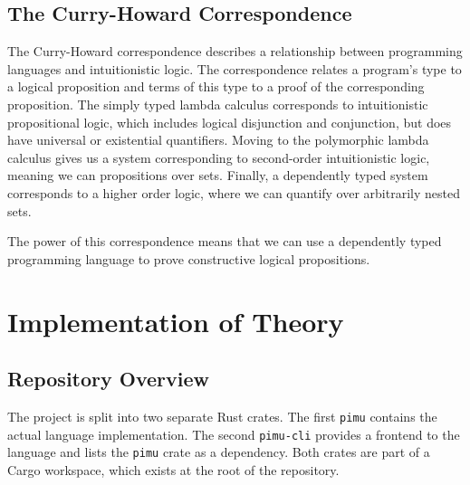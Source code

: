 \documentclass[12pt,a4paper,twoside]{report}
\begin{document}
\subsection{The Curry-Howard Correspondence}

The Curry-Howard correspondence \cite{howard80} describes a relationship between programming languages and intuitionistic logic.
The correspondence relates a program's type to a logical proposition and terms of this type to a proof of the corresponding proposition.
The simply typed lambda calculus corresponds to intuitionistic propositional logic, which includes logical disjunction and conjunction, but does have universal or existential quantifiers.
Moving to the polymorphic lambda calculus gives us a system corresponding to second-order intuitionistic logic, meaning we can propositions over sets.
Finally, a dependently typed system corresponds to a higher order logic, where we can quantify over arbitrarily nested sets.

The power of this correspondence means that we can use a dependently typed programming language to prove constructive logical propositions.

\section{Implementation of Theory}

\subsection{Repository Overview}

The project is split into two separate Rust crates. The first \texttt{pimu} contains the actual language implementation. The second \texttt{pimu-cli} provides a frontend to the language and lists the \texttt{pimu} crate as a dependency. Both crates are part of a Cargo workspace, which exists at the root of the repository.
\end{document}
